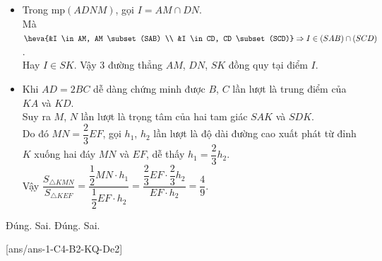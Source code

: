\begin{ex}
{\begin{itemize}
			Suy ra tứ giác $EFNM$ là hình thang.
			\item Trong mp$(ADNM)$, gọi $I=AM \cap DN$.\\
			Mà $\heva{&I \in AM, AM \subset(SAB) \\ &I \in CD, CD \subset(SCD)} \Rightarrow I \in(SAB) \cap(SCD)$.\\
			Hay $I\in SK$. Vậy 3 đường thẳng $AM$, $DN$, $SK$ đồng quy tại điểm $I$.
			\item Khi $AD=2BC$ dễ dàng chứng minh được $B$, $C$ lần lượt là trung điểm của $KA$ và $KD$. \\
			Suy ra $M$, $N$ lần lượt là trọng tâm của hai tam giác $SAK$ và $SDK$.\\
			Do đó $MN=\dfrac{2}{3} EF$, gọi $h_1$, $h_2$ lần lượt là độ dài đường cao xuất phát từ đỉnh $K$ xuống hai đáy $MN$ và $EF$, dễ thấy $h_1=\dfrac{2}{3} h_2$.\\ 
			Vậy $\dfrac{S_{\triangle KMN}}{S_{\triangle KEF}}=\dfrac{\dfrac{1}{2} MN \cdot h_1}{\dfrac{1}{2} EF \cdot h_2}=\dfrac{\dfrac{2}{3} EF \cdot \dfrac{2}{3} h_2}{EF \cdot h_2}=\dfrac{4}{9}$.
		\end{itemize}
		\begin{itemchoice}
			\itemch Đúng.
			\itemch	Sai.
			\itemch Đúng.
			\itemch	Sai.
		\end{itemchoice}
	}
\end{ex}


[ans/ans-1-C4-B2-KQ-De2]
\caukq

